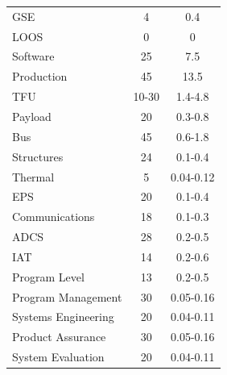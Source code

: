 \begin{table}[htbp]
\begin{tabular}{p{10cm} | c | c }
        \hspace{2.0cm}GSE &         4 &      0.4    \\

      \hspace{2.0cm}LOOS &         0 &         0 \\ \hline

  \hspace{1.0cm}Software &         25 &         7.5 \\

\hspace{1.0cm}Production &         45 &         13.5 \\ \hline

       \hspace{2.0cm}TFU &         10-30 &       1.4-4.8   \\ \hline

   \hspace{2.5cm}Payload &         20 &       0.3-0.8   \\

       \hspace{2.5cm}Bus &         45 &        0.6-1.8  \\ \hline

 \hspace{3.0cm}Structures &         24 &       0.1-0.4   \\

   \hspace{3.0cm}Thermal &         5 &         0.04-0.12 \\

       \hspace{3.0cm}EPS &         20 &        0.1-0.4  \\

\hspace{3.0cm}Communications &         18 &      0.1-0.3    \\

      \hspace{3.0cm}ADCS &         28 &         0.2-0.5 \\ \hline

       \hspace{2.5cm}IAT &         14&         0.2-0.6 \\

\hspace{2.5cm}Program Level &         13 &         0.2-0.5 \\ \hline
 \hspace{3.0cm}Program Management &         30 &       0.05-0.16   \\
 \hspace{3.0cm}Systems Engineering &         20 &        0.04-0.11  \\
 \hspace{3.0cm}Product Assurance &         30 &       0.05-0.16   \\
 \hspace{3.0cm}System Evaluation &         20 &       0.04-0.11   \\ \hline


\end{tabular}
\end{table}
